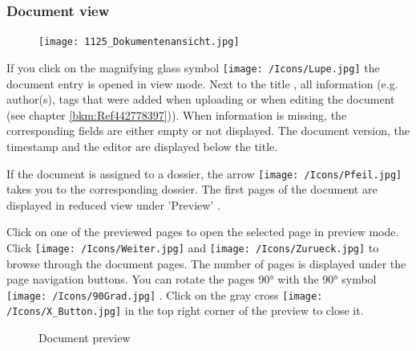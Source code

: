 \pagebreak
\subsubsection{Document view}
\label{bkm:Ref443047930}

\begin{figure}
\vspace{-15pt}
\texttt{[image: 1125\_Dokumentenansicht.jpg]}
\end{figure}

If you click on the magnifying glass symbol \texttt{[image: /Icons/Lupe.jpg]} the document entry is opened in view mode. Next to the title , all information (e.g. author(s), tags that were added when uploading or when editing the document (see chapter \ref{bkm:Ref442778397})). When information is missing, the corresponding fields are either empty or not displayed. The document version, the timestamp and the editor are displayed below the title. \newline

If the document is assigned to a dossier, the arrow \texttt{[image: /Icons/Pfeil.jpg]}  takes you to the corresponding dossier. The first pages of the document are displayed in reduced view under 'Preview' .

\vspace{\baselineskip}

Click on one of the previewed pages  to open the selected page in preview mode.  Click \texttt{[image: /Icons/Weiter.jpg]} and \texttt{[image: /Icons/Zurueck.jpg]}   to browse through the document pages. The number of pages  is displayed under the page navigation buttons. You can rotate the pages 90° with the 90° symbol \texttt{[image: /Icons/90Grad.jpg]} . Click on the gray cross \texttt{[image: /Icons/X\_Button.jpg]}  in the top right corner of the preview to close it.

\begin{figure}[H]
\caption{Document preview}
\end{figure}

